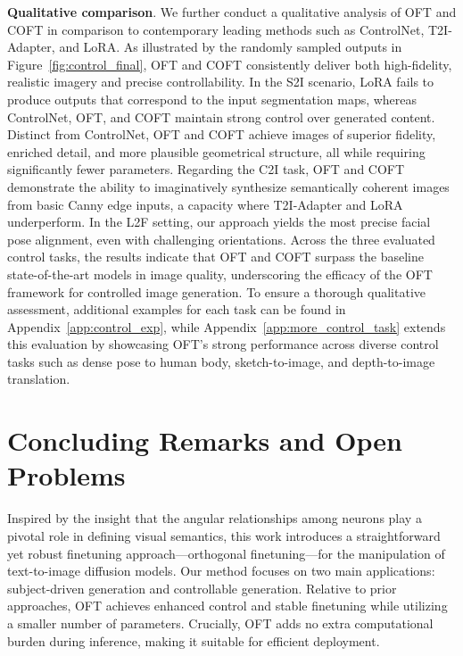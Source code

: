 {\textbf{Qualitative comparison}. We further conduct a qualitative analysis of OFT and COFT in comparison to contemporary leading methods such as ControlNet, T2I-Adapter, and LoRA. As illustrated by the randomly sampled outputs in Figure~\ref{fig:control_final}, OFT and COFT consistently deliver both high-fidelity, realistic imagery and precise controllability. In the S2I scenario, LoRA fails to produce outputs that correspond to the input segmentation maps, whereas ControlNet, OFT, and COFT maintain strong control over generated content. Distinct from ControlNet, OFT and COFT achieve images of superior fidelity, enriched detail, and more plausible geometrical structure, all while requiring significantly fewer parameters. Regarding the C2I task, OFT and COFT demonstrate the ability to imaginatively synthesize semantically coherent images from basic Canny edge inputs, a capacity where T2I-Adapter and LoRA underperform. In the L2F setting, our approach yields the most precise facial pose alignment, even with challenging orientations. Across the three evaluated control tasks, the results indicate that OFT and COFT surpass the baseline state-of-the-art models in image quality, underscoring the efficacy of the OFT framework for controlled image generation. To ensure a thorough qualitative assessment, additional examples for each task can be found in Appendix~\ref{app:control_exp}, while Appendix~\ref{app:more_control_task} extends this evaluation by showcasing OFT’s strong performance across diverse control tasks such as dense pose to human body, sketch-to-image, and depth-to-image translation.

\section{Concluding Remarks and Open Problems}

Inspired by the insight that the angular relationships among neurons play a pivotal role in defining visual semantics, this work introduces a straightforward yet robust finetuning approach—orthogonal finetuning—for the manipulation of text-to-image diffusion models. Our method focuses on two main applications: subject-driven generation and controllable generation. Relative to prior approaches, OFT achieves enhanced control and stable finetuning while utilizing a smaller number of parameters. Crucially, OFT adds no extra computational burden during inference, making it suitable for efficient deployment.

}

